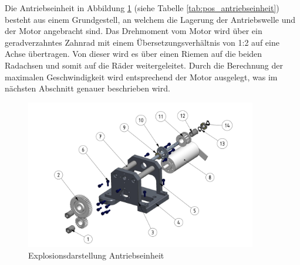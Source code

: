 \documentclass[../../main.tex]{subfiles}
\begin{document}
    \newpage

    Die Antriebseinheit in Abbildung \ref{fig:antriebseinheit} (siehe Tabelle \ref{tab:pos_antriebseinheit}) besteht aus einem Grundgestell, an welchem die Lagerung der Antriebswelle und der Motor angebracht sind. Das Drehmoment vom Motor wird über ein geradverzahntes Zahnrad mit einem Übersetzungsverhältnis von 1:2 auf eine Achse übertragen. Von dieser wird es über einen Riemen auf die beiden Radachsen und somit auf die Räder weitergeleitet. Durch die Berechnung der maximalen Geschwindigkeit wird entsprechend der Motor ausgelegt, was im nächsten Abschnitt genauer beschrieben wird.\\

    \begin{figure}[H] %
        \centering
        \includegraphics[width=0.9\textwidth]{antriebseinheit.png}
        \caption{Explosionsdarstellung Antriebseinheit}
        \label{fig:antriebseinheit}
    \end{figure} 
\end{document}
